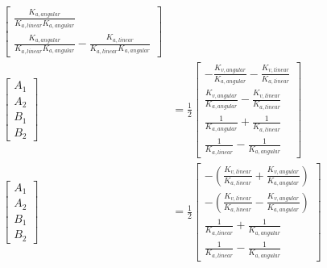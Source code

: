 \begin{align*}
\begin{bmatrix}
      \frac{K_{a,angular}}{K_{a,linear} K_{a,angular}} \\
    \frac{K_{a,angular}}{K_{a,linear} K_{a,angular}} -
      \frac{K_{a,linear}}{K_{a,linear} K_{a,angular}}
  \end{bmatrix} \\
  \begin{bmatrix}
    A_1 \\
    A_2 \\
    B_1 \\
    B_2
  \end{bmatrix} &= \frac{1}{2}
  \begin{bmatrix}
    -\frac{K_{v,angular}}{K_{a,angular}} -
      \frac{K_{v,linear}}{K_{a,linear}} \\
    \frac{K_{v,angular}}{K_{a,angular}} -
      \frac{K_{v,linear}}{K_{a,linear}} \\
    \frac{1}{K_{a,angular}} + \frac{1}{K_{a,linear}} \\
    \frac{1}{K_{a,linear}} - \frac{1}{K_{a,angular}}
  \end{bmatrix} \\
  \begin{bmatrix}
    A_1 \\
    A_2 \\
    B_1 \\
    B_2
  \end{bmatrix} &= \frac{1}{2}
  \begin{bmatrix}
    -\left(\frac{K_{v,linear}}{K_{a,linear}} +
      \frac{K_{v,angular}}{K_{a,angular}}\right) \\
    -\left(\frac{K_{v,linear}}{K_{a,linear}} -
      \frac{K_{v,angular}}{K_{a,angular}}\right) \\
    \frac{1}{K_{a,linear}} + \frac{1}{K_{a,angular}} \\
    \frac{1}{K_{a,linear}} - \frac{1}{K_{a,angular}}
  \end{bmatrix}
\end{align*}

